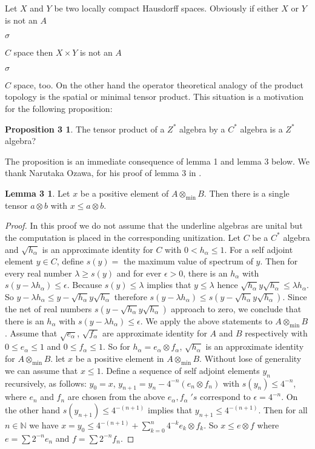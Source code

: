 \documentclass[a4paper,10pt]{amsart}
\theoremstyle{definition}
\newtheorem*{prop3}{Proposition   3}
\newtheorem*{lem3} {Lemma       3}
\theoremstyle{plain}
\begin{document}
Let $X$  and $Y$ be  two  locally compact  Hausdorff   spaces. Obviously  if either $X$  or $Y$ is  not  an $A$\begin{Large}${\sigma}$\end{Large}$C$  space then $X\times Y$ is  not an $A$\begin{Large}${\sigma}$\end{Large}$C$ space, too. On the other hand the operator theoretical  analogy of the product topology is the spatial or minimal tensor product. This  situation is  a motivation for the  following proposition:
\begin{prop3}
The tensor product of a $Z^{*}$ algebra  by  a  $C^{*}$  algebra is  a  $Z^{*}$  algebra?
\end{prop3}
 The proposition is  an immediate consequence of lemma 1  and lemma 3 below. We  thank Narutaka  Ozawa, for his  proof of lemma 3  in \cite{OZ}.
\begin{lem3}
Let $x$  be  a positive element of $A\otimes_{\text{min}} B$. Then there is  a  single tensor $a\otimes b$ with
$x\leq a\otimes b$.
\end{lem3}
\begin{proof}
In this proof we do not  assume  that the underline  algebras are unital but the  computation is placed in the  corresponding unitization. Let $C$  be  a  $C^{*}$ algebra  and $\sqrt{h_{\alpha}}$  is  an approximate  identity for $C$ with $0<h_{\alpha} \leq 1$. For  a self adjoint  element $y\in C$, define $s(y)=$ the  maximum value of spectrum of $y$. Then for every real number $\lambda \geq s(y)$ and for ever $\epsilon > 0$, there is an $h_{\alpha}$ with
$s(y - \lambda h_{\alpha}) \leq \epsilon$. Because $s(y) \leq \lambda$ implies that $y\leq \lambda$ hence
$\sqrt{h_{\alpha}} y \sqrt{h_{\alpha}} \leq \lambda h_{\alpha}$. So $y-\lambda h_{\alpha} \leq y-\sqrt{h_{\alpha}} y \sqrt{h_{\alpha}}$ therefore  $s(y-\lambda h_{\alpha}) \leq s( y-\sqrt{h_{\alpha}} y \sqrt{h_{\alpha}})$. Since the  net of  real numbers $s( y-\sqrt{h_{\alpha}} y \sqrt{h_{\alpha}})$ approach to zero, we conclude that there is  an $h_{\alpha}$  with $s(y - \lambda h_{\alpha}) \leq \epsilon$. We  apply the  above  statements  to $A\otimes_{\text{min}} B$. Assume that $\sqrt{e_{\alpha}}$, $\sqrt{f_{\alpha}}$ are approximate identity for $A$  and $B$ respectively  with $0\leq e_{\alpha} \leq 1$ and $0\leq f_{\alpha} \leq 1$. So for $h_{\alpha}=e_{\alpha} \otimes f_{\alpha}$, $\sqrt{h_{\alpha}}$ is  an approximate identity for $A\otimes_{\text{min}} B$. let $x$  be  a positive  element in $A\otimes_{\text{min}} B$. Without lose of  generality we can assume that $x\leq 1$. Define  a  sequence of self adjoint  elements $y_{n}$ recursively,  as follows: $y_{0}=x$,\; $y_{n+1}=y_{n}-4^{-n}(e_{n} \otimes f_{n})$ with $s(y_{n}) \leq 4^{-n}$, where $e_{n}$  and $f_{n}$ are chosen from the above  $e_{\alpha}, f_{\alpha}\;'s$ correspond to $\epsilon =4^{-n}$. On the other hand $s(y_{n+1}) \leq 4^{-(n+1)}$ implies that $y_{n+1} \leq 4^{-(n+1)}$. Then for all $n\in \mathbb{N}$ we have  $x=y_{0} \leq  4^{-(n+1)}+\sum_{k=0}^{n} 4^{-k} e_{k} \otimes f_{k} $. So $x\leq e\otimes f$ where $e=\sum 2^{-n}e_{n}$
and $f=\sum 2^{-n}f_{n}$.
\end{proof}
\end{document}
